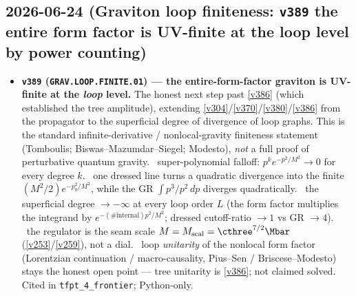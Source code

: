 \subsection*{2026-06-24 (Graviton loop finiteness: \texttt{v389} the entire form factor is UV-finite at the loop level by power counting)}
\begin{itemize}
\item \textbf{\texttt{v389} (\texttt{GRAV.LOOP.FINITE.01}) --- the entire-form-factor graviton is UV-finite at the \emph{loop} level.}
The honest next step past \vref{v386} (which established the tree amplitude), extending \vref{v304}/\vref{v370}/\vref{v380}/\vref{v386}
from the propagator to the superficial degree of divergence of loop graphs. This is the standard infinite-derivative /
nonlocal-gravity finiteness statement (Tomboulis; Biswas--Mazumdar--Siegel; Modesto), \emph{not} a full proof of
perturbative quantum gravity. \mE\ super-polynomial falloff: $p^k e^{-p^2/M^2}\to0$ for every degree $k$. \mE\ one dressed
line turns a quadratic divergence into the finite $(M^2/2)e^{-p_0^2/M^2}$, while the GR $\int p^3/p^2\,dp$ diverges
quadratically. \mE\ the superficial degree $\to-\infty$ at every loop order $L$ (the form factor multiplies the integrand by
$e^{-(\#\mathrm{internal})p^2/M^2}$; dressed cutoff-ratio $\to1$ vs GR $\to4$). \mE\ the regulator is the seam scale
$M=M_{\mathrm{scal}}=\cthree^{7/2}\Mbar$ (\vref{v253}/\vref{v259}), not a dial. \mC\mO\ loop \emph{unitarity} of the nonlocal
form factor (Lorentzian continuation / macro-causality, Pius--Sen / Briscese--Modesto) stays the honest open point --- tree
unitarity is \vref{v386}; not claimed solved. Cited in \texttt{tfpt\_4\_frontier}; Python-only.
\end{itemize}

